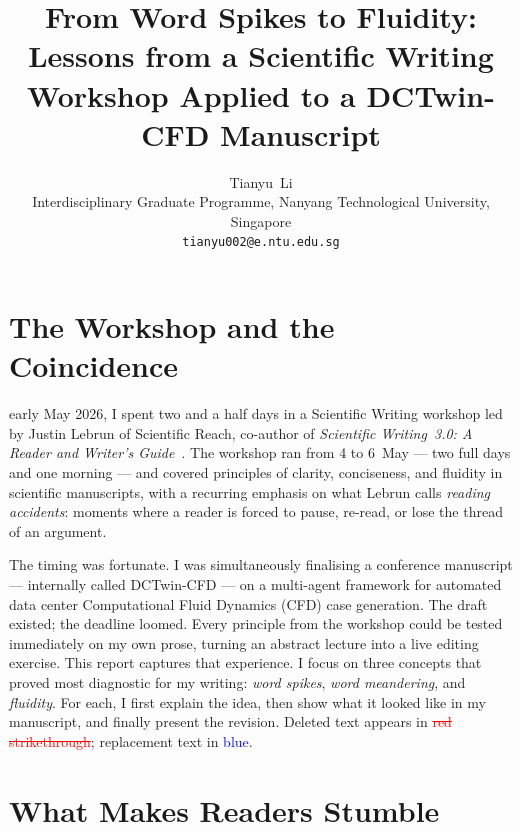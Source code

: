 \documentclass[journal]{IEEEtran}
\newcommand{\revdel}[1]{\textcolor{red}{\sout{#1}}}
\newcommand{\revadd}[1]{\textcolor{blue}{#1}}
\begin{document}
\title{From Word Spikes to Fluidity: Lessons from a Scientific Writing Workshop Applied to a DCTwin-CFD Manuscript}

\author{Tianyu~Li \\
Interdisciplinary Graduate Programme, Nanyang Technological University, Singapore \\
\texttt{tianyu002@e.ntu.edu.sg}}

\maketitle

\section{The Workshop and the Coincidence}

 early May 2026, I spent two and a half days in a Scientific Writing workshop led by Justin Lebrun of Scientific Reach, co-author of \emph{Scientific Writing~3.0: A Reader and Writer's Guide}~\cite{lebrun2021}. The workshop ran from 4 to 6~May --- two full days and one morning --- and covered principles of clarity, conciseness, and fluidity in scientific manuscripts, with a recurring emphasis on what Lebrun calls \emph{reading accidents}: moments where a reader is forced to pause, re-read, or lose the thread of an argument.

The timing was fortunate. I was simultaneously finalising a conference manuscript --- internally called DCTwin-CFD --- on a multi-agent framework for automated data center Computational Fluid Dynamics (CFD) case generation. The draft existed; the deadline loomed. Every principle from the workshop could be tested immediately on my own prose, turning an abstract lecture into a live editing exercise. This report captures that experience. I focus on three concepts that proved most diagnostic for my writing: \emph{word spikes}, \emph{word meandering}, and \emph{fluidity}. For each, I first explain the idea, then show what it looked like in my manuscript, and finally present the revision. Deleted text appears in \revdel{red strikethrough}; replacement text in \revadd{blue}.

\section{What Makes Readers Stumble}
\end{document}
